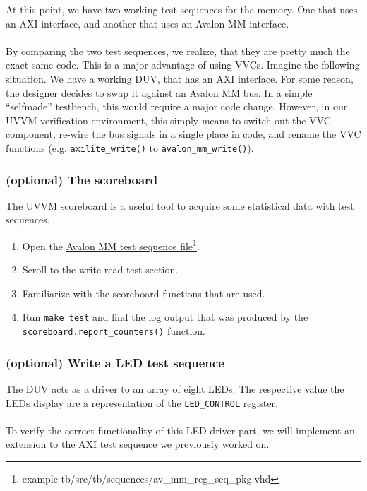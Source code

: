 At this point, we have two working test sequences for the memory. One that uses an AXI interface, and another that uses an Avalon MM interface.\\
\\
By comparing the two test sequences, we realize, that they are pretty much the exact same code. This is a major advantage of using VVCs. Imagine the following situation. We have a working DUV, that has an AXI interface. For some reason, the designer decides to swap it against an Avalon MM bus. In a simple ``selfmade'' testbench, this would require a major code change. However, in our UVVM verification environment, this simply means to switch out the VVC component, re-wire the bus signals in a single place in code, and rename the VVC functions (e.g. \texttt{axilite\_write()} to \texttt{avalon\_mm\_write()}).

\subsubsection{(optional) The scoreboard}

The UVVM scoreboard is a useful tool to acquire some statistical data with test sequences.

\begin{enumerate}
      \item Open the \href{../../example-tb/src/tb/sequences/av\_mm\_reg\_seq\_pkg.vhd} {Avalon MM test sequence file}\footnote{example-tb/src/tb/sequences/av\_mm\_reg\_seq\_pkg.vhd}.
      \item Scroll to the write-read test section.
      \item Familiarize with the scoreboard functions that are used.
      \item Run \texttt{make test} and find the log output that was produced by the \texttt{scoreboard.report\_counters()} function.
\end{enumerate}

\subsubsection{(optional) Write a LED test sequence}

The DUV acts as a driver to an array of eight LEDs. The respective value the LEDs display are a representation of the \texttt{LED\_CONTROL} register.\\
\\
To verify the correct functionality of this LED driver part, we will implement an extension to the AXI test sequence we previously worked on.

